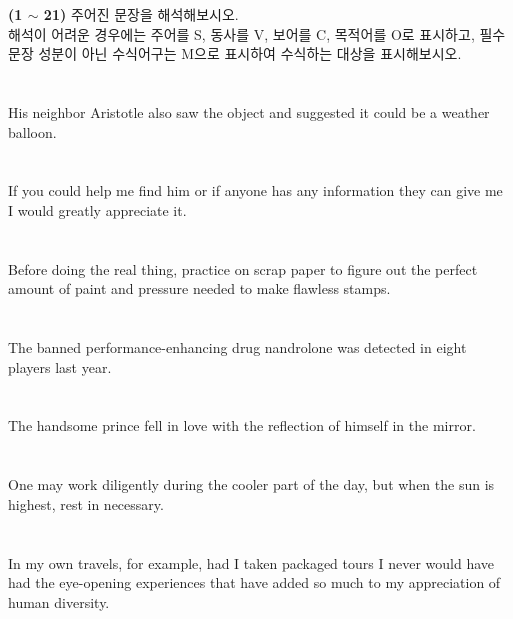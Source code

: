 \documentclass[a4paper, twocolumn]{oblivoir}
\begin{document}
    \textbf{(1 $\sim$  21)} 주어진 문장을 해석해보시오. \\
    해석이 어려운 경우에는 주어를 S, 동사를 V, 보어를 C, 목적어를 O로 표시하고, 
    필수 문장 성분이 아닌 수식어구는 M으로 표시하여 수식하는 대상을 표시해보시오. 
    \thispagestyle{firststyle}
    \section{}
    His neighbor Aristotle also saw the object and suggested it could be a weather balloon.
    
    \section{}
    If you could help me find him or if anyone has any information they can give me I would greatly appreciate it.

    \section{}
    Before doing the real thing, practice on scrap paper to figure out the perfect amount of paint and pressure needed to make flawless stamps.

    \section{}
    The banned performance-enhancing drug nandrolone was detected in eight players last year.

    \section{}
    The handsome prince fell in love with the reflection of himself in the mirror.

    \section{}
    One may work diligently during the cooler part of the day, but when the sun is highest, rest in necessary.

    \section{}
    In my own travels, for example, had I taken packaged tours I never would have had the eye-opening experiences that have added so much to my appreciation of human diversity.
\end{document}
